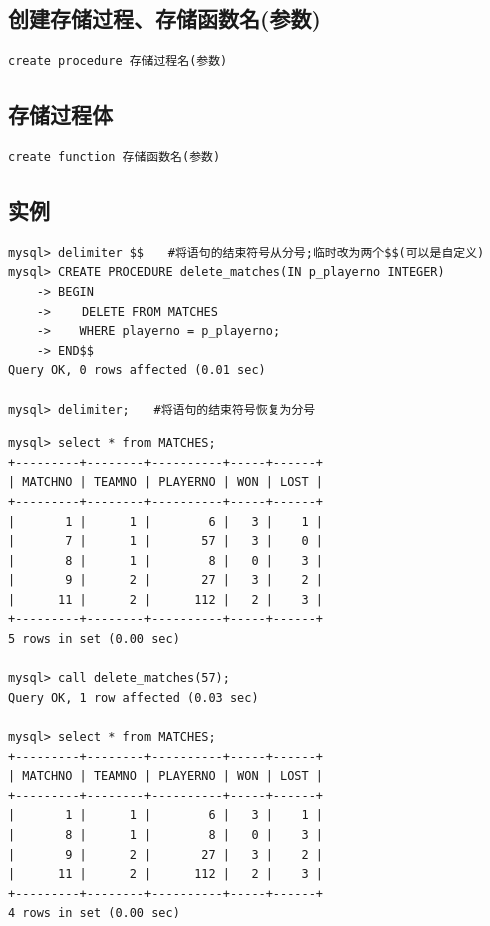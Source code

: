 \documentclass[UTF8,a4paper,12pt]{ctexbook}
\begin{document}
		\subsection{创建存储过程、存储函数名(参数)}
			\begin{lstlisting}
create procedure 存储过程名(参数)			
			\end{lstlisting}		
		
		\subsection{存储过程体}
			\begin{lstlisting}
create function 存储函数名(参数)			
			\end{lstlisting}			
		
		\subsection{实例}
			\begin{lstlisting}
mysql> delimiter $$　　#将语句的结束符号从分号;临时改为两个$$(可以是自定义)
mysql> CREATE PROCEDURE delete_matches(IN p_playerno INTEGER)
    -> BEGIN
    -> 　　DELETE FROM MATCHES
    ->    WHERE playerno = p_playerno;
    -> END$$
Query OK, 0 rows affected (0.01 sec)
 
mysql> delimiter;　　#将语句的结束符号恢复为分号    			
			\end{lstlisting}
			
			\begin{lstlisting}
mysql> select * from MATCHES;
+---------+--------+----------+-----+------+
| MATCHNO | TEAMNO | PLAYERNO | WON | LOST |
+---------+--------+----------+-----+------+
|       1 |      1 |        6 |   3 |    1 |
|       7 |      1 |       57 |   3 |    0 |
|       8 |      1 |        8 |   0 |    3 |
|       9 |      2 |       27 |   3 |    2 |
|      11 |      2 |      112 |   2 |    3 |
+---------+--------+----------+-----+------+
5 rows in set (0.00 sec)
 
mysql> call delete_matches(57);
Query OK, 1 row affected (0.03 sec)
 
mysql> select * from MATCHES;
+---------+--------+----------+-----+------+
| MATCHNO | TEAMNO | PLAYERNO | WON | LOST |
+---------+--------+----------+-----+------+
|       1 |      1 |        6 |   3 |    1 |
|       8 |      1 |        8 |   0 |    3 |
|       9 |      2 |       27 |   3 |    2 |
|      11 |      2 |      112 |   2 |    3 |
+---------+--------+----------+-----+------+
4 rows in set (0.00 sec)			
			\end{lstlisting}
\end{document}
